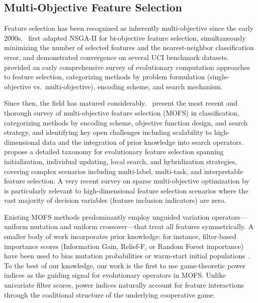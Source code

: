 \documentclass{article} %
\begin{document}
\subsection{Multi-Objective Feature Selection}

Feature selection has been recognized as inherently multi-objective since the early 2000s.~\citet{hamdani2007multi} first adapted NSGA-II for bi-objective feature selection, simultaneously minimizing the number of selected features and the nearest-neighbor classification error, and demonstrated convergence on several UCI benchmark datasets.~\citet{xue2016survey} provided an early comprehensive survey of evolutionary computation approaches to feature selection, categorizing methods by problem formulation (single-objective vs.\ multi-objective), encoding scheme, and search mechanism.

Since then, the field has matured considerably.~\citet{jiao2024survey} present the most recent and thorough survey of multi-objective feature selection (MOFS) in classification, categorizing methods by encoding scheme, objective function design, and search strategy, and identifying key open challenges including scalability to high-dimensional data and the integration of prior knowledge into search operators.~\citet{song2024evolutionary} propose a detailed taxonomy for evolutionary feature selection spanning initialization, individual updating, local search, and hybridization strategies, covering complex scenarios including multi-label, multi-task, and interpretable feature selection. A very recent survey on sparse multi-objective optimization by~\citet{shao2025evolutionary} is particularly relevant to high-dimensional feature selection scenarios where the vast majority of decision variables (feature inclusion indicators) are zero.

Existing MOFS methods predominantly employ unguided variation operators---uniform mutation and uniform crossover---that treat all features symmetrically. A smaller body of work incorporates prior knowledge: for instance, filter-based importance scores (Information Gain, Relief-F, or Random Forest importance) have been used to bias mutation probabilities or warm-start initial populations~\citep[cf.\ \S5.2]{song2024evolutionary}. To the best of our knowledge, our work is the first to use game-theoretic power indices as the guiding signal for evolutionary operators in MOFS. Unlike univariate filter scores, power indices naturally account for feature interactions through the coalitional structure of the underlying cooperative game.
\end{document}
